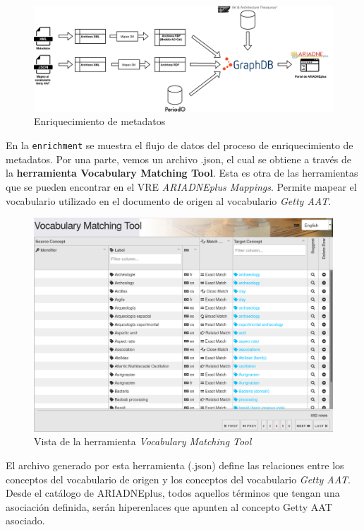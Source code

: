 \documentclass[
]{article}
\begin{document}
\begin{figure}
\hypertarget{enrichment}{%
\centering
\includegraphics{../_static/images/enrichment.png}
\caption{Enriquecimiento de metadatos}\label{enrichment}
}
\end{figure}

En la \texttt{enrichment} se muestra el flujo de datos del proceso de
enriquecimiento de metadatos. Por una parte, vemos un archivo .json, el
cual se obtiene a través de la \textbf{herramienta Vocabulary Matching
Tool}. Esta es otra de las herramientas que se pueden encontrar en el
VRE \emph{ARIADNEplus Mappings}. Permite mapear el vocabulario utilizado
en el documento de origen al vocabulario \emph{Getty AAT}.

\begin{figure}
\hypertarget{vmt}{%
\centering
\includegraphics{../_static/images/vmt.png}
\caption{Vista de la herramienta \emph{Vocabulary Matching
Tool}}\label{vmt}
}
\end{figure}

El archivo generado por esta herramienta (.json) define las relaciones
entre los conceptos del vocabulario de origen y los conceptos del
vocabulario \emph{Getty AAT}. Desde el catálogo de ARIADNEplus, todos
aquellos términos que tengan una asociación definida, serán hiperenlaces
que apunten al concepto Getty AAT asociado.
\end{document}
